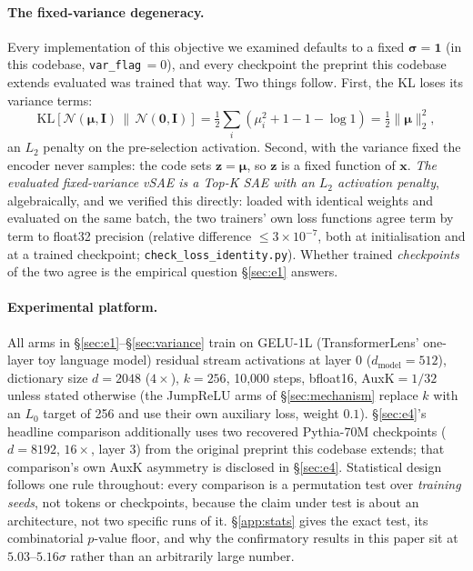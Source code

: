 \documentclass[11pt]{article}
\begin{document}
\paragraph{The fixed-variance degeneracy.} Every implementation of this
objective we examined defaults to a fixed $\boldsymbol{\sigma}=\mathbf{1}$
(in this codebase, \texttt{var\_flag}$\,=0$), and every checkpoint the
preprint this codebase extends evaluated was trained that way. Two things
follow.
First, the KL loses its variance terms:
\begin{equation}
\mathrm{KL}\!\left[\mathcal{N}(\boldsymbol{\mu},\mathbf{I})\,\|\,\mathcal{N}(\mathbf{0},\mathbf{I})\right]
= \tfrac{1}{2}\textstyle\sum_i \left(\mu_i^2 + 1 - 1 - \log 1\right)
= \tfrac{1}{2}\|\boldsymbol{\mu}\|_2^2 ,
\label{eq:kl}
\end{equation}
an $L_2$ penalty on the pre-selection activation. Second, with the variance
fixed the encoder never samples: the code sets $\mathbf{z}=\boldsymbol{\mu}$,
so $\mathbf{z}$ is a fixed function of $\mathbf{x}$. \emph{The evaluated fixed-variance vSAE
is a Top-K SAE with an $L_2$ activation penalty}, algebraically, and we
verified this directly: loaded with identical weights and evaluated on the
same batch, the two trainers' own loss functions agree term by term to float32
precision (relative difference $\le3\times10^{-7}$, both at initialisation and
at a trained checkpoint; \texttt{check\_loss\_identity.py}). Whether
trained \emph{checkpoints} of the two agree is the empirical question
\S\ref{sec:e1} answers.

\paragraph{Experimental platform.} All arms in \S\ref{sec:e1}--\S\ref{sec:variance}
train on GELU-1L (TransformerLens' one-layer toy language model) residual
stream activations at layer 0 ($d_{\mathrm{model}}=512$), dictionary size
$d=2048$ ($4\times$), $k=256$, 10{,}000 steps, bfloat16, AuxK$=1/32$ unless
stated otherwise (the JumpReLU arms of \S\ref{sec:mechanism} replace $k$ with
an $L_0$ target of 256 and use their own auxiliary loss, weight $0.1$). \S\ref{sec:e4}'s headline comparison additionally uses two
recovered Pythia-70M checkpoints ($d=8192$, $16\times$, layer 3) from the
original preprint this codebase extends; that comparison's own AuxK
asymmetry is disclosed in \S\ref{sec:e4}. Statistical design follows one rule
throughout:
every comparison is a permutation test over \emph{training seeds}, not tokens
or checkpoints, because the claim under test is about an architecture, not
two specific runs of it. \S\ref{app:stats} gives the exact test, its
combinatorial $p$-value floor, and why the confirmatory results in this
paper sit at $5.03$--$5.16\sigma$ rather than an arbitrarily large number.
\end{document}
